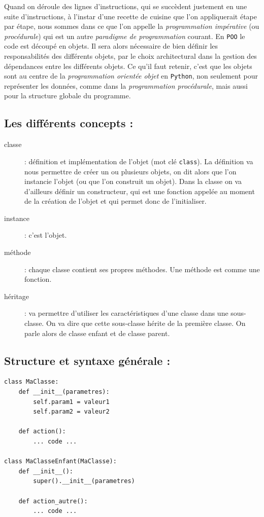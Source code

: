\documentclass[a4paper,11pt]{book}
\begin{document}
Quand on déroule des lignes d'instructions, qui se succèdent justement en une suite d'instructions, à l'instar d'une recette de cuisine que l'on appliquerait étape par étape, nous sommes dans ce que l'on appelle la \textit{programmation impérative} (ou \textit{procédurale}) qui est un autre \textit{paradigme de programmation} courant. En \texttt{POO} le code est découpé en objets. Il sera alors nécessaire de bien définir les responsabilités  des différents objets, par le choix architectural dans la gestion des dépendances entre les différents objets. Ce qu'il faut retenir, c'est que les objets sont au centre de la \textit{programmation orientée objet} en \texttt{Python}, non seulement pour représenter les données, comme dans la \textit{programmation procédurale}, mais aussi pour la structure globale du programme.
\medskip

\subsection*{Les différents concepts :}
\begin{description}
	\item[classe] : définition et implémentation de l'objet (mot clé \texttt{class}). La définition va nous permettre de créer un ou plusieurs objets, on dit alors que l'on instancie l'objet (ou que l'on construit un objet). Dans la classe on va d'ailleurs définir un constructeur, qui est une fonction appelée au moment de la création de l'objet et qui permet donc de l'initialiser.
	\item[instance] : c'est l'objet.
	\item[méthode] : chaque classe contient ses propres méthodes. Une méthode est comme une fonction.
	\item[héritage] : va permettre d'utiliser les caractéristiques d'une classe dans une sous-classe. On va dire que cette sous-classe hérite de la première classe. On parle alors de classe enfant et de classe parent.
\end{description}
\medskip

\subsection*{Structure et syntaxe générale :}
\begin{lstlisting}[caption=Syntaxe générale]
class MaClasse:
    def __init__(parametres):
        self.param1 = valeur1
        self.param2 = valeur2

    def action():
        ... code ...

class MaClasseEnfant(MaClasse):
    def __init__():
        super().__init__(parametres)
    
    def action_autre():
        ... code ...
\end{lstlisting}
\medskip
\end{document}

